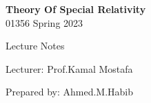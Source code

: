 \documentclass{article}
\begin{document}
\begingroup
{}
\centering
\vspace*{6cm}
\par\normalfont\fontsize{30}{30}\sffamily\selectfont
\textbf{Theory Of Special Relativity}\\
{\LARGE 01356 Spring 2023}\par
\vspace*{1cm}
{\Huge Lecture Notes}\par
\vspace*{1cm}
{\Huge Lecturer: Prof.Kamal Mostafa}\par
{\Huge Prepared by: Ahmed.M.Habib}\par
\endgroup


\newpage
{}
\end{document}
